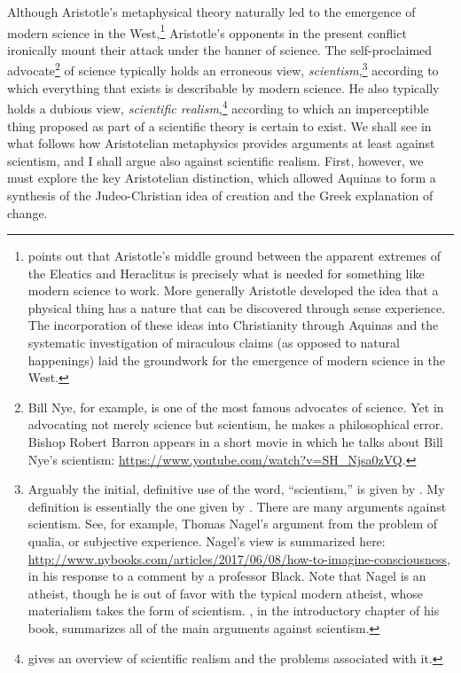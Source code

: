 \documentclass[twocolumn]{article}
\begin{document}
Although Aristotle's metaphysical theory naturally led to the emergence of
modern science in the West,\footnote{%
   \citet[Chapter 1]{f2014} points out that Aristotle's middle ground between
   the apparent extremes of the Eleatics and Heraclitus is precisely what is
   needed for something like modern science to work.  More generally Aristotle
   developed the idea that a physical thing has a nature that can be discovered
   through sense experience.  The incorporation of these ideas into
   Christianity through Aquinas and the systematic investigation of miraculous
   claims (as opposed to natural happenings) laid the groundwork for the
   emergence of modern science in the West.
}
Aristotle's opponents in the present conflict ironically mount their attack
under the banner of science.  The self-proclaimed advocate\footnote{%
   Bill Nye, for example, is one of the most famous advocates of science.  Yet
   in advocating not merely science but scientism, he makes a philosophical
   error.  Bishop Robert Barron appears in a short movie in which he talks
   about Bill Nye's scientism:
   \url{https://www.youtube.com/watch?v=SH_Njsa0zVQ}.%
}
of science typically holds an erroneous view, \emph{scientism},\footnote{%
   Arguably the initial, definitive use of the word, ``scientism,'' is given by
   \cite{s1991}.  My definition is essentially the one given by \cite{h2011}.
   There are many arguments against scientism.  See, for example, Thomas
   Nagel's argument from the problem of qualia, or subjective experience.
   Nagel's view is summarized here:
   \url{http://www.nybooks.com/articles/2017/06/08/how-to-imagine-consciousness},
   in his response to a comment by a professor Black.  Note that Nagel is an
   atheist, though he is out of favor with the typical modern atheist, whose
   materialism takes the form of scientism.  \cite{f2014}, in the introductory
   chapter of his book, summarizes all of the main arguments against
   scientism.%
}
according to which everything that exists is describable by modern science. He
also typically holds a dubious view, \emph{scientific realism},\footnote{%
   \cite{c2016} gives an overview of scientific realism and the problems
   associated with it.
}
according to which an imperceptible thing proposed as part of a scientific
theory is certain to exist.  We shall see in what follows how Aristotelian
metaphysics provides arguments at least against scientism, and I shall argue
also against scientific realism.  First, however, we must explore the key
Aristotelian distinction, which allowed Aquinas to form a synthesis of the
Judeo-Christian idea of creation and the Greek explanation of change.
\end{document}
